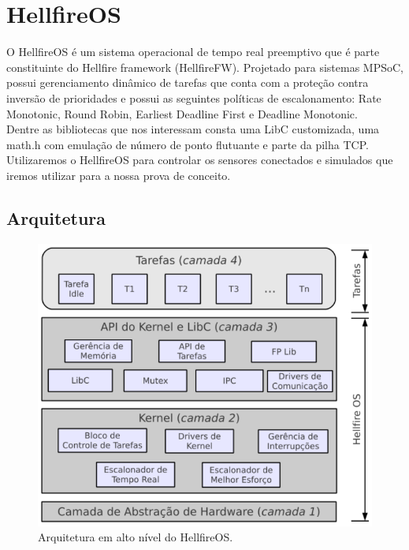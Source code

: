\section{HellfireOS}
\label{sec:HellfireOS}
O HellfireOS é um sistema operacional de tempo real preemptivo que é parte constituinte
do Hellfire framework (HellfireFW). Projetado para sistemas MPSoC, possui gerenciamento
dinâmico de tarefas que conta com a proteção contra inversão de prioridades e possui as
seguintes políticas de escalonamento:
Rate Monotonic, Round Robin, Earliest Deadline First e Deadline Monotonic.\\
Dentre as bibliotecas que nos interessam consta uma LibC customizada, uma math.h com emulação
de número de ponto flutuante e parte da pilha TCP.\\
Utilizaremos o HellfireOS para controlar os sensores conectados e simulados que iremos utilizar para a nossa
prova de conceito.
\subsection{Arquitetura}
\begin{figure}[H]
	\centering
		\includegraphics[width=\textwidth,height=\textheight,keepaspectratio]{fig/HellfireArch.png}
	\caption{Arquitetura em alto nível do HellfireOS.}
\end{figure}

